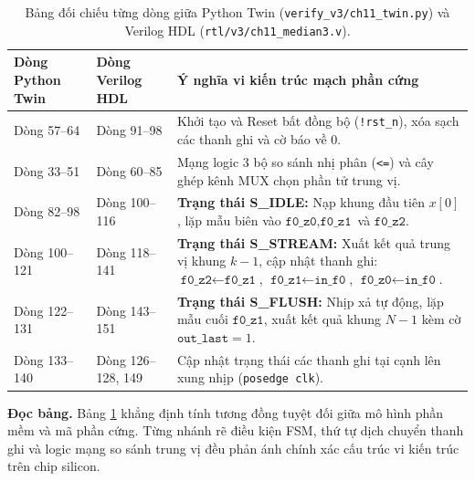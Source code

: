 \begin{table}[htbp]
\centering
\small
\caption{Bảng đối chiếu từng dòng giữa Python Twin (\texttt{verify\_v3/ch11\_twin.py}) và Verilog HDL (\texttt{rtl/v3/ch11\_median3.v}).}
\label{tab:ch11_twin_vs_hdl}
\begin{tabular}{p{3.8cm}p{3.8cm}p{7.2cm}}
\toprule
\textbf{Dòng Python Twin} & \textbf{Dòng Verilog HDL} & \textbf{Ý nghĩa vi kiến trúc mạch phần cứng} \\
\midrule
Dòng 57--64 & Dòng 91--98 & Khởi tạo và Reset bất đồng bộ (\texttt{!rst\_n}), xóa sạch các thanh ghi và cờ báo về $0$. \\
Dòng 33--51 & Dòng 60--85 & Mạng logic 3 bộ so sánh nhị phân (\texttt{<=}) và cây ghép kênh MUX chọn phần tử trung vị. \\
Dòng 82--98 & Dòng 100--116 & \textbf{Trạng thái S\_IDLE:} Nạp khung đầu tiên $x[0]$, lặp mẫu biên vào $\texttt{f0\_z0}, \texttt{f0\_z1}$ và $\texttt{f0\_z2}$. \\
Dòng 100--121 & Dòng 118--141 & \textbf{Trạng thái S\_STREAM:} Xuất kết quả trung vị khung $k-1$, cập nhật thanh ghi: $\texttt{f0\_z2} \leftarrow \texttt{f0\_z1}$, $\texttt{f0\_z1} \leftarrow \texttt{in\_f0}$, $\texttt{f0\_z0} \leftarrow \texttt{in\_f0}$. \\
Dòng 122--131 & Dòng 143--151 & \textbf{Trạng thái S\_FLUSH:} Nhịp xả tự động, lặp mẫu cuối $\texttt{f0\_z1}$, xuất kết quả khung $N-1$ kèm cờ $\texttt{out\_last}=1$. \\
Dòng 133--140 & Dòng 126--128, 149 & Cập nhật trạng thái các thanh ghi tại cạnh lên xung nhịp (\texttt{posedge clk}). \\
\bottomrule
\end{tabular}
\end{table}

\textbf{Đọc bảng.} Bảng \ref{tab:ch11_twin_vs_hdl} khẳng định tính tương đồng tuyệt đối giữa mô hình phần mềm và mã phần cứng. Từng nhánh rẽ điều kiện FSM, thứ tự dịch chuyển thanh ghi và logic mạng so sánh trung vị đều phản ánh chính xác cấu trúc vi kiến trúc trên chip silicon.

